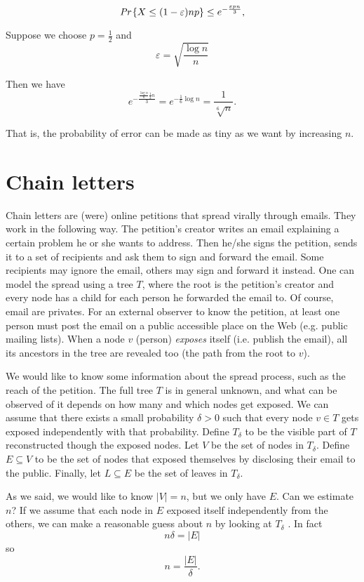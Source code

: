 \begin{equation}
	\emph{Pr}\left\{X \leq (1-\varepsilon)np\right\} \leq e^{-\frac{\varepsilon pn}{3}},
\end{equation}

Suppose we choose $p = \frac{1}{2}$ and
\begin{equation}
	\varepsilon = \sqrt{\frac{\log n}{n}}
\end{equation}

Then we have
\[e^{-\frac{\frac{\log n}{n}\frac{1}{2}n}{3}} = e^{-\frac{1}{6}\log n} = \frac{1}{\sqrt[6]{n}}.\]

That is, the probability of error can be made as tiny as we want by increasing $n$.

\section{Chain letters}

Chain letters are (were) online petitions that spread virally through emails. They work in the following way. The petition's creator writes an email explaining a certain problem he or she wants to address. Then he/she signs the petition, sends it to a set of recipients and ask them to sign and forward the email. Some recipients may ignore the email, others may sign and forward it instead. One can model the spread using a tree $T$, where the root is the petition's creator and every node has a child for each person he forwarded the email to. Of course, email are privates. For an external observer to know the petition, at least one person must post the email on a public accessible place on the Web (e.g. public mailing lists). When a node $v$ (person) \emph{exposes} itself (i.e. publish the email), all its ancestors in the tree are revealed too (the path from the root to $v$).

We would like to know some information about the spread process, such as the reach of the petition. The full tree $T$ is in general unknown, and what can be observed of it depends on how many and which nodes get exposed. We can assume that there exists a small probability $\delta > 0$ such that every node $v \in T$ gets exposed independently with that probability. Define $T_\delta$ to be the visible part of $T$ reconstructed though the exposed nodes. Let $V$ be the set of nodes in $T_\delta$. Define $E \subseteq V$ to be the set of nodes that exposed themselves by disclosing their email to the public. Finally, let $L \subseteq E$ be the set of leaves in $T_\delta$.

As we said, we would like to know $|V| = n$, but we only have $E$. Can we estimate $n$? If we assume that each node in $E$ exposed itself independently from the others, we can make a reasonable guess about $n$ by looking at $T_\delta$ \cite{chainletters}. In fact
\begin{equation}
 n\delta = |E|
\end{equation}
so 
\begin{equation}
n= \frac{|E|}{\delta}.
\end{equation}

